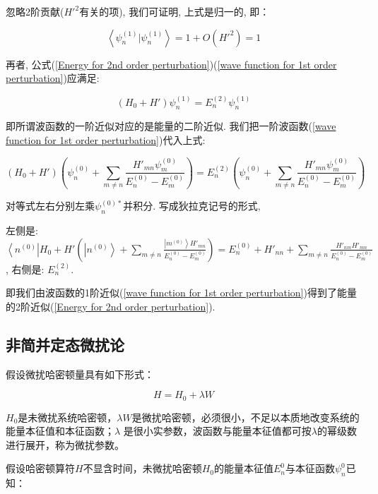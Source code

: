 忽略2阶贡献($H'^2$有关的项), 我们可证明, 上式是归一的, 即：


\begin{equation*}
\left\langle \psi_n^{(1)} | \psi_n^{(1)} \right\rangle = 1 + O(H'^2)
=1
\end{equation*}

再者, 公式(\ref{Energy for 2nd order perturbation})(\ref{wave
function for 1st order perturbation})应满足:


\begin{equation*}
\left( H_0 + H' \right) \psi_n^{(1)} = E_n^{(2)}\psi_n^{(1)}
\end{equation*}


即所谓波函数的一阶近似对应的是能量的二阶近似.
我们把一阶波函数(\ref{wave function for 1st order
perturbation})代入上式:

\begin{equation*}
\left( H_0 + H' \right) \left( \psi_n^{(0)} + \sum\limits_{m \ne n}
\frac{ H'_{mn} \psi_m^{(0)}}{E_n^{(0)}-E_m^{(0)}} \right) =
E_n^{(2)}\left( \psi_n^{(0)} + \sum\limits_{m \ne n} \frac{ H'_{mn}
\psi_m^{(0)}}{E_n^{(0)}-E_m^{(0)}} \right)
\end{equation*}

对等式左右分别左乘$\psi_n^{(0)*}$并积分. 写成狄拉克记号的形式,

左侧是: $\left\langle n^{(0)} \right| H_0 + H' \left(
\left|n^{(0)}\right\rangle + \sum\limits_{m \ne n}
\frac{\left|m^{(0)}\right\rangle H'_{mn} }{E_n^{(0)} - E_m^{(0)}}
\right) =E_n^{(0)} + H'_{nn} + \sum\limits_{m \ne n}
\frac{H'_{nm}H'_{mn}}{E_n^{(0)}-E_m^{(0)}}$, 右侧是: $E_n^{(2)}$.

即我们由波函数的1阶近似(\ref{wave function for 1st order
perturbation})得到了能量的2阶近似(\ref{Energy for 2nd order
perturbation}).

\subsection{非简并定态微扰论}

假设微扰哈密顿量具有如下形式：

\begin{equation}\label{22-1}
H = H_0  + \lambda W
\end{equation}

$H_0$是未微扰系统哈密顿，$\lambda W$是微扰哈密顿，必须很小，不足以本质地改变系统的能量本征值和本征函数；$\lambda$ 是很小实参数，波函数与能量本征值都可按$\lambda$的幂级数进行展开，称为微扰参数。

假设哈密顿算符$H$不显含时间，未微扰哈密顿$H_0$的能量本征值$E_n ^0$与本征函数$\psi _n^0 $已知：


